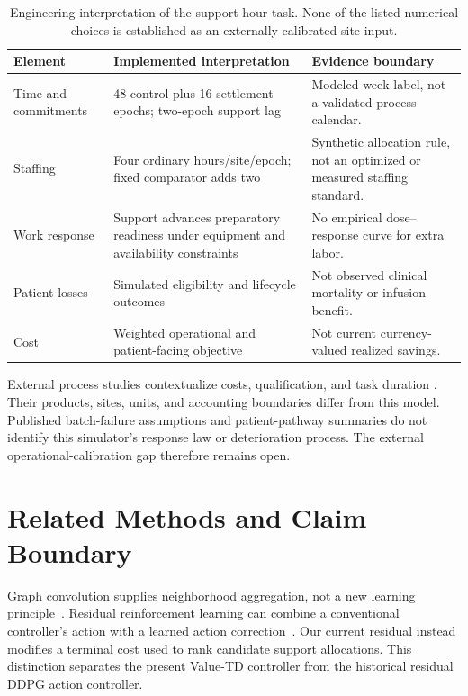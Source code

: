 \documentclass[preprint,review,12pt]{elsarticle}
\begin{document}
\begin{table}[tbp]
\centering
\caption{Engineering interpretation of the support-hour task. None of the
listed numerical choices is established as an externally calibrated site input.}
\label{tab:engineering-scope}
\small
\begin{tabularx}{\textwidth}{p{}XX}
\toprule
Element & Implemented interpretation & Evidence boundary \\
\midrule
Time and commitments & 48 control plus 16 settlement epochs; two-epoch
support lag & Modeled-week label, not a validated process calendar. \\
Staffing & Four ordinary hours/site/epoch; fixed comparator adds two &
Synthetic allocation rule, not an optimized or measured staffing standard. \\
Work response & Support advances preparatory readiness under equipment
and availability constraints & No empirical dose--response curve for extra labor. \\
Patient losses & Simulated eligibility and lifecycle outcomes & Not
observed clinical mortality or infusion benefit. \\
Cost & Weighted operational and patient-facing objective & Not current
currency-valued realized savings. \\
\bottomrule
\end{tabularx}
\end{table}

External process studies contextualize costs, qualification, and task duration
\cite{Ran2020DecentralizedCART,Fitzgerald2022AutomatedASC}. Their products,
sites, units, and accounting boundaries differ from this model. Published
batch-failure assumptions and patient-pathway summaries
\cite{Lopes2020VeinToVein,Nastoupil2020StandardOfCare} do not identify
this simulator's response law or deterioration process. The external
operational-calibration gap therefore remains open.

\section{Related Methods and Claim Boundary}
\label{sec:literature}
Graph convolution supplies neighborhood aggregation, not a new learning
principle~\cite{Kipf2017GCN}. Residual reinforcement learning can combine
a conventional controller's action with a learned action
correction~\cite{Johannink2019ResidualRL}. Our current residual instead
modifies a terminal cost used to rank candidate support allocations.
This distinction separates the present Value-TD controller from the
historical residual DDPG action controller.
\end{document}
